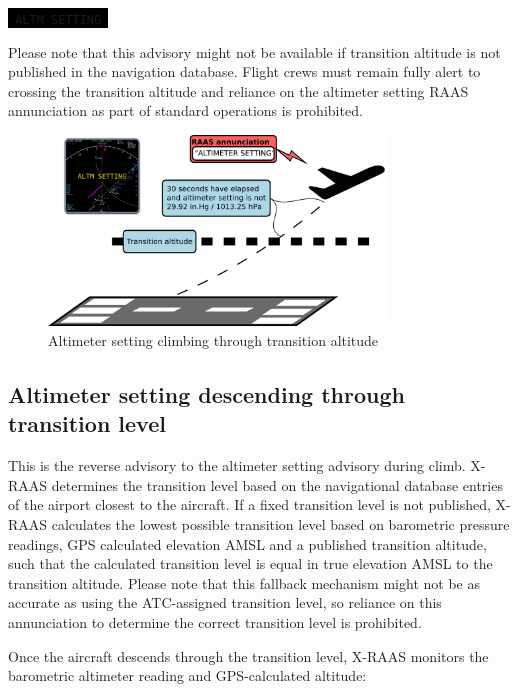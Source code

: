 \documentclass[a4paper,12pt]{article}
\newcommand{\visualadvisory}[3][b]{%
    \ifthenelse{\equal{#1}{b}}{\begin{center}}{}
    \noindent
    \colorbox{black}{\textcolor{#2visualadvisorycolor}{\large\texttt{~#3~}}}
    \ifthenelse{\equal{#1}{b}}{\end{center}}{}}
\begin{document}
\visualadvisory{nonroutine}{ALTM SETTING}

\noindent Please note that this advisory might not be available if
transition altitude is not published in the navigation database. Flight
crews must remain fully alert to crossing the transition altitude and
reliance on the altimeter setting RAAS annunciation as part of standard
operations is prohibited.

\begin{figure}[H]
\begin{center}
\includegraphics[width=0.8\textwidth]{../src/alt_setting_clb.pdf}
\end{center}
\caption{Altimeter setting climbing through transition altitude}
\end{figure}

\newpage
\subsection{Altimeter setting descending through transition level}
\label{subsec:AltmQNHQFEMon}

This is the reverse advisory to the altimeter setting advisory during
climb. X-RAAS determines the transition level based on the navigational
database entries of the airport closest to the aircraft. If a fixed
transition level is not published, X-RAAS calculates the lowest possible
transition level based on barometric pressure readings, GPS calculated
elevation AMSL and a published transition altitude, such that the
calculated transition level is equal in true elevation AMSL to the
transition altitude. Please note that this fallback mechanism might not
be as accurate as using the ATC-assigned transition level, so reliance on
this annunciation to determine the correct transition level is
prohibited.

Once the aircraft descends through the transition level, X-RAAS monitors
the barometric altimeter reading and GPS-calculated altitude:
\end{document}
